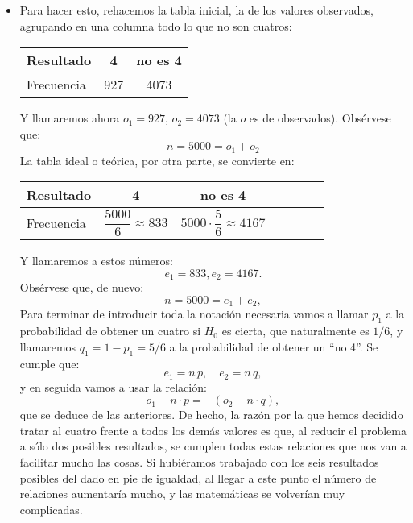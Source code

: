 \begin{itemize}
    \item Para hacer esto, rehacemos la tabla inicial, la de los valores observados, agrupando en una columna todo lo que no son cuatros:
            \begin{center}
            \begin{tabular}{|l|c|c|}
              \hline
              Resultado & 4 & no es 4 \\
              \hline
              Frecuencia & 927 & 4073\\
              \hline
            \end{tabular}
            \end{center}
            Y llamaremos ahora $o_1=927$, $o_2=4073$ (la $o$ es de observados). Obsérvese que:
            \[n=5000=o_1+o_2\]
            La tabla ideal o teórica, por otra parte, se convierte en:
            \begin{center}
            \begin{tabular}{|l|c|c|c|c|c|c|}
              \hline
              Resultado & 4 & no es 4 \\
              \hline
              Frecuencia \rule{0cm}{0.6cm}& $\dfrac{5000}{6}\approx 833$ & $5000\cdot\dfrac{5}{6}\approx 4167$\\[2mm]
              \hline
            \end{tabular}
            \end{center}
            Y llamaremos a estos números:
            \[e_1=833, e_2=4167.\]
            Obsérvese que, de nuevo:
            \[n=5000=e_1+e_2,\]
            Para terminar de introducir toda la notación necesaria vamos a llamar $p_1$ a la probabilidad de obtener un cuatro si $H_0$ es cierta, que naturalmente es $1/6$, y llamaremos $q_1=1-p_1=5/6$ a la probabilidad de obtener un ``no 4''. Se cumple que:
            \[e_1=n\, p,\quad e_2=n\,q,\]
            y en seguida vamos a usar la relación:
            \[o_1-n\cdot p=-(o_2-n\cdot q),\]
            que se deduce de las anteriores. De hecho, la razón por la que hemos decidido tratar al cuatro frente a todos los demás valores es que, al reducir el problema a sólo dos posibles resultados, se cumplen todas estas relaciones que nos van a facilitar mucho las cosas. Si hubiéramos trabajado con los seis resultados posibles del dado en pie de igualdad, al llegar a este punto el número de relaciones aumentaría mucho, y las matemáticas se volverían muy complicadas.



\end{itemize}
